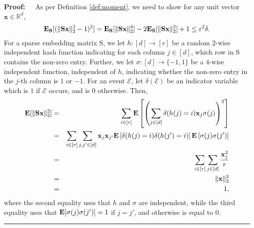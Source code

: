 \documentclass[11pt]{article}
\newenvironment{proof}{\begin{trivlist} \item {\bf Proof:~~}}
  {\qed\end{trivlist}}
\newcommand{\mat}[1]{{\ensuremath{\bm{\mathrm{#1}}}}}
\def\matS{\mat{S}}
\def\frac#1#2{{#1\over #2}}
\def\qed{\hfill\rule{2mm}{2mm}}
\def\x{{\mathbf x}}
\newcommand{\eps}{\varepsilon}
\begin{document}
\begin{proof}
As per Definition \ref{def:moment}, we need to show for any unit vector $\x \in \mathbb{R}^d$,
\begin{eqnarray}\label{eqn:toshow}
{\bf E}_{\matS} [(\|\matS\x\|_2^2-1)^2] = {\bf E}_{\matS}[\|\matS\x\|_2^4] - 2{\bf E}_{\matS}[\|\matS\x\|_2^2] + 1 \leq \eps^2 \delta.
\end{eqnarray}
For a sparse embedding matrix $\matS$, we let $h:[d] \rightarrow [r]$ be a random $2$-wise independent 
hash function indicating for each column
$j \in [d]$, which row in $\matS$ contains the non-zero entry. Further, we let $\sigma:[d] \rightarrow \{-1,1\}$ be a $4$-wise
independent function, independent of $h$, indicating whether
the non-zero entry in the $j$-th column is $1$ or $-1$. For an event $\mathcal{E}$, let $\delta(\mathcal{E})$ be an indicator variable
which is $1$ if $\mathcal{E}$ occurs, and is $0$ otherwise. Then,
\begin{eqnarray*}
{\bf E}[\|\matS\x\|_2^2] & = & \sum_{i \in [r]} {\bf E} \left [\left (\sum_{j \in [d]} \delta(h(j) = i) \x_j \sigma(j) \right )^2 \right ]\\
& = & \sum_{i \in [r]} \sum_{j, j' \in [d]} \x_j \x_{j'} {\bf E} \left [\delta(h(j) = i)\delta(h(j') = i) \right ] {\bf E} 
\left [\sigma(j) \sigma(j') \right ]\\
& = & \sum_{i \in [r]} \sum_{j \in [d]} \frac{\x_j^2}{r}\\
& = & \|\x\|_2^2\\
& = & 1,
\end{eqnarray*}
where the second equality uses that $h$ and $\sigma$ are independent, while the third equality uses that ${\bf E} [\sigma(j) \sigma(j')] = 1$ if $j = j'$, and otherwise
is equal to $0$. 


\end{proof}
\end{document}
